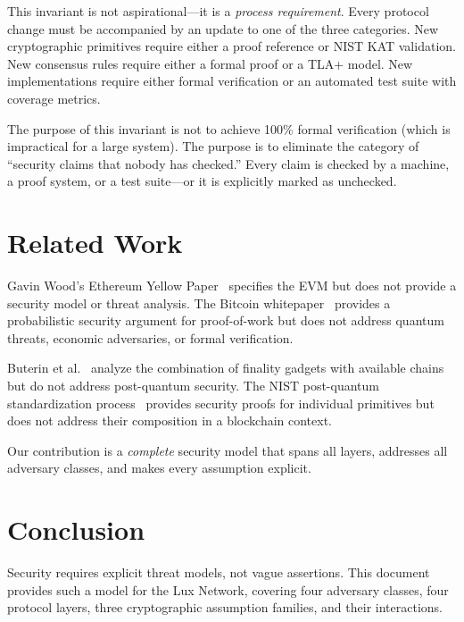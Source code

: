 \documentclass[11pt,a4paper]{article}
\begin{document}
This invariant is not aspirational---it is a \emph{process requirement}. Every
protocol change must be accompanied by an update to one of the three categories.
New cryptographic primitives require either a proof reference or NIST KAT validation.
New consensus rules require either a formal proof or a TLA+ model. New implementations
require either formal verification or an automated test suite with coverage metrics.

The purpose of this invariant is not to achieve 100\% formal verification (which is
impractical for a large system). The purpose is to eliminate the category of
``security claims that nobody has checked.'' Every claim is checked by a machine, a
proof system, or a test suite---or it is explicitly marked as unchecked.

\section{Related Work}
\label{sec:related}

Gavin Wood's Ethereum Yellow Paper~\cite{wood2014ethereum} specifies the EVM but does
not provide a security model or threat analysis. The Bitcoin whitepaper~\cite{nakamoto2008bitcoin}
provides a probabilistic security argument for proof-of-work but does not address
quantum threats, economic adversaries, or formal verification.

Buterin et al.~\cite{buterin2020combining} analyze the combination of finality
gadgets with available chains but do not address post-quantum security. The NIST
post-quantum standardization process~\cite{fips204} provides security proofs for
individual primitives but does not address their composition in a blockchain context.

Our contribution is a \emph{complete} security model that spans all layers,
addresses all adversary classes, and makes every assumption explicit.

\section{Conclusion}

Security requires explicit threat models, not vague assertions. This document
provides such a model for the Lux Network, covering four adversary classes, four
protocol layers, three cryptographic assumption families, and their interactions.
\end{document}
